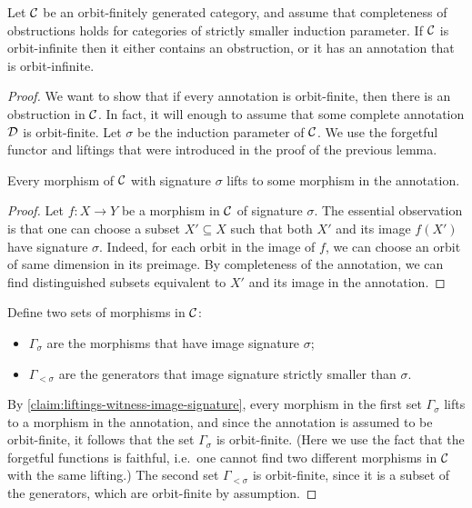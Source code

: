 \begin{lemma}\label{lem:there-must-be-an-obstruction-or-annotation}
        Let ${\mathcal C}$ be an orbit-finitely generated category, and assume that completeness of obstructions holds for categories of strictly smaller  induction parameter. 
 If ${\mathcal C}$ is orbit-infinite then it either  contains an obstruction, or it has an annotation that is orbit-infinite. 
\end{lemma}
\begin{proof}
    We want to show that if every annotation is orbit-finite, then there is an obstruction in ${\mathcal C}$. 
    In fact, it will enough to assume that some complete annotation ${\mathcal D}$ is orbit-finite.  Let $\sigma$ be the induction parameter of ${\mathcal C}$. We use the forgetful functor and liftings that were introduced in the proof of the previous lemma. 

    \begin{claim}\label{claim:liftings-witness-image-signature}
    Every morphism of ${\mathcal C}$ with signature $\sigma$ lifts to some morphism in the annotation. 
\end{claim}
\begin{proof}
Let $f : X \to Y$ be a morphism in ${\mathcal C}$ of signature $\sigma$. The essential observation is that one  can choose a subset $X' \subseteq X$  such that both $X'$ and its image $f(X')$ have signature $\sigma$. 
Indeed, for  each orbit in the image of $f$, we can  choose an orbit of same dimension in its preimage. By completeness of the annotation, we can find distinguished subsets equivalent to $X'$ and its image in the annotation.
\end{proof}

    Define two sets of morphisms in ${\mathcal C}$:
    \begin{itemize}
        \item $\Gamma_{\sigma}$ are the morphisms that have  image signature $\sigma$;
        \item $\Gamma_{<\sigma}$ are the  generators that image signature strictly smaller than $\sigma$.
    \end{itemize}

By \cref{claim:liftings-witness-image-signature}, every morphism in the first set $\Gamma_\sigma$ lifts to a morphism in the annotation, and since the annotation is assumed to be orbit-finite, it follows that the set $\Gamma_\sigma$ is orbit-finite. (Here we use the fact that the forgetful functions is faithful, i.e.~one cannot find two different morphisms in ${\mathcal C}$ with the same lifting.) The second set $\Gamma_{<\sigma}$ is orbit-finite, since it is a subset of the generators, which are orbit-finite by assumption.



\end{proof}
